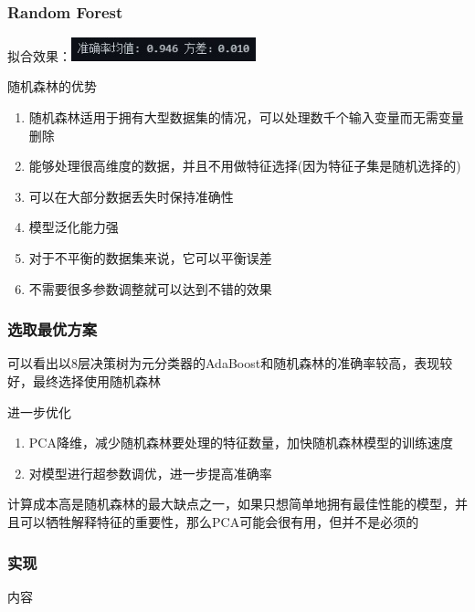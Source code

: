 \documentclass[aspectratio=43, 12pt, utf8, mathserif]{ctexbeamer} %
\begin{document}
\begin{frame}
    \frametitle{Random Forest}
    拟合效果：\includegraphics[width=0.4\textwidth]{image/randomforest.jpg}
    \begin{block}{随机森林的优势}
    \begin{enumerate}
        \item 随机森林适用于拥有大型数据集的情况，可以处理数千个输入变量而无需变量删除
        \item 能够处理很高维度的数据，并且不用做特征选择(因为特征子集是随机选择的)
        \item 可以在大部分数据丢失时保持准确性
        \item 模型泛化能力强
        \item 对于不平衡的数据集来说，它可以平衡误差
        \item 不需要很多参数调整就可以达到不错的效果
    \end{enumerate}
    \end{block}
\end{frame}

\begin{frame}
    \frametitle{选取最优方案}
    可以看出以8层决策树为元分类器的AdaBoost和随机森林的准确率较高，表现较好，最终选择使用随机森林
    
    \vspace{0.5cm}
    进一步优化
    \begin{enumerate}
        \item PCA降维，减少随机森林要处理的特征数量，加快随机森林模型的训练速度
        \item 对模型进行超参数调优，进一步提高准确率
    \end{enumerate}
    \vspace{0.5cm}
    计算成本高是随机森林的最大缺点之一，如果只想简单地拥有最佳性能的模型，并且可以牺牲解释特征的重要性，那么PCA可能会很有用，但并不是必须的
\end{frame}

\begin{frame}
    \frametitle{实现}
    内容
\end{frame}
\end{document}

